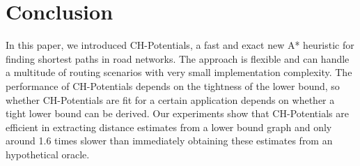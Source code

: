 \documentclass[letterpaper]{article} %
\begin{document}
\section{Conclusion}
\label{sec:conclusion}

In this paper, we introduced CH-Potentials, a fast and exact new A* heuristic for finding shortest paths in road networks.
The approach is flexible and can handle a multitude of routing scenarios with very small implementation complexity.
The performance of CH-Potentials depends on the tightness of the lower bound, so whether CH-Potentials are fit for a certain application depends on whether a tight lower bound can be derived.
Our experiments show that CH-Potentials are efficient in extracting distance estimates from a lower bound graph and only around 1.6 times slower than immediately obtaining these estimates from an hypothetical oracle.



\pagebreak



\end{document}
